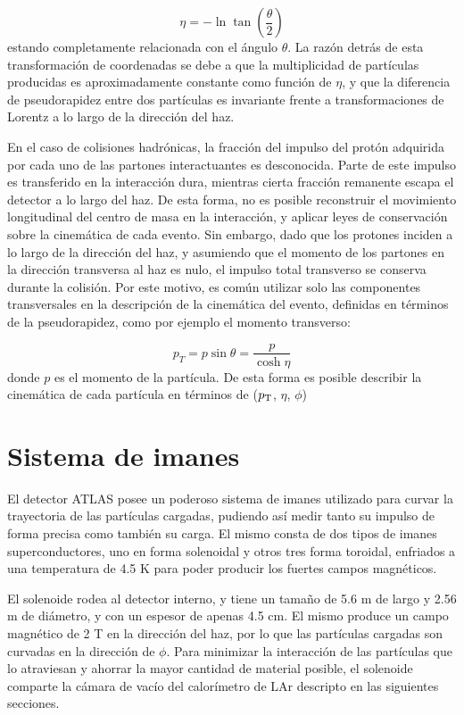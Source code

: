\begin{equation}
\eta =-\ln \tan\left( \frac{\theta}{2} \right)
\end{equation}
%
estando completamente relacionada con el ángulo $\theta$. La razón detrás de esta transformación de coordenadas se debe a que la multiplicidad de partículas producidas es aproximadamente constante como función de $\eta$, y que la diferencia de pseudorapidez entre dos partículas es invariante frente a transformaciones de Lorentz a lo largo de la dirección del haz. 


En el caso de colisiones hadrónicas, la fracción del impulso del protón adquirida por cada uno de las partones interactuantes es desconocida. Parte de este impulso es transferido en la interacción dura, mientras cierta fracción remanente escapa el detector a lo largo del haz. De esta forma, no es posible reconstruir el movimiento longitudinal del centro de masa en la interacción, y aplicar leyes de conservación sobre la cinemática de cada evento. Sin embargo, dado que los protones inciden a lo largo de la dirección del haz, y asumiendo que el momento de los partones en la dirección transversa al haz es nulo, el impulso total transverso se conserva durante la colisión. Por este motivo, es común utilizar solo las componentes transversales en la descripción de la cinemática del evento, definidas en términos de la pseudorapidez, como por ejemplo el momento transverso:

\begin{equation}
p_{T}=p\sin\theta=\frac{p}{\cosh{\eta}}
\end{equation}
%
donde $p$ es el momento de la partícula. De esta forma es posible describir la cinemática de cada partícula en términos de ($p_{\text{T}}$, $\eta$, $\phi$)

\section{Sistema de imanes}

El detector ATLAS posee un poderoso sistema de imanes \cite{magnet} utilizado para curvar la trayectoria de las partículas cargadas, pudiendo así medir tanto su impulso de forma precisa como también su carga. El mismo consta de dos tipos de imanes superconductores, uno en forma solenoidal y otros tres forma toroidal, enfriados a una temperatura de 4.5 K para poder producir los fuertes campos magnéticos.

El solenoide rodea al detector interno, y tiene un tamaño de 5.6 m de largo y 2.56 m de diámetro, 
y con un espesor de apenas 4.5 cm. El mismo produce un campo magnético de 2 T en la dirección del haz, por lo que las partículas cargadas son curvadas en la dirección de $\phi$. Para minimizar la interacción de las partículas que lo atraviesan y ahorrar la mayor cantidad de material posible, el solenoide comparte la cámara de vacío del calorímetro de LAr descripto en las siguientes secciones.

